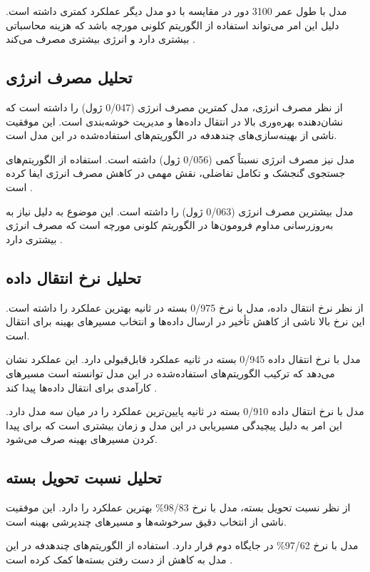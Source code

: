 \documentclass[12pt, onecolumn, a4paper]{article}
\begin{document}
مدل  با طول عمر 3100 دور در مقایسه با دو مدل دیگر عملکرد کمتری داشته است. دلیل این امر می‌تواند استفاده از الگوریتم کلونی مورچه باشد که هزینه محاسباتی بیشتری دارد و انرژی بیشتری مصرف می‌کند \cite{ref7}.

\subsection*{تحلیل مصرف انرژی}
از نظر مصرف انرژی، مدل  کمترین مصرف انرژی (0/047 ژول) را داشته است که نشان‌دهنده بهره‌وری بالا در انتقال داده‌ها و مدیریت خوشه‌بندی است. این موفقیت ناشی از بهینه‌سازی‌های چندهدفه در الگوریتم‌های استفاده‌شده در این مدل است.

مدل  نیز مصرف انرژی نسبتاً کمی (0/056 ژول) داشته است. استفاده از الگوریتم‌های جستجوی گنجشک و تکامل تفاضلی، نقش مهمی در کاهش مصرف انرژی ایفا کرده است \cite{ref5}.

مدل  بیشترین مصرف انرژی (0/063 ژول) را داشته است. این موضوع به دلیل نیاز به به‌روزرسانی مداوم فرومون‌ها در الگوریتم کلونی مورچه است که مصرف انرژی بیشتری دارد \cite{ref6}.

\subsection*{تحلیل نرخ انتقال داده}
از نظر نرخ انتقال داده، مدل  با نرخ 0/975 بسته در ثانیه بهترین عملکرد را داشته است. این نرخ بالا ناشی از کاهش تأخیر در ارسال داده‌ها و انتخاب مسیرهای بهینه برای انتقال است.

مدل  با نرخ انتقال داده 0/945 بسته در ثانیه عملکرد قابل‌قبولی دارد. این عملکرد نشان می‌دهد که ترکیب الگوریتم‌های استفاده‌شده در این مدل توانسته است مسیرهای کارآمدی برای انتقال داده‌ها پیدا کند \cite{ref5}.

مدل  با نرخ انتقال داده 0/910 بسته در ثانیه پایین‌ترین عملکرد را در میان سه مدل دارد. این امر به دلیل پیچیدگی مسیریابی در این مدل و زمان بیشتری است که برای پیدا کردن مسیرهای بهینه صرف می‌شود.

\subsection*{تحلیل نسبت تحویل بسته}
از نظر نسبت تحویل بسته، مدل  با نرخ 98/83\% بهترین عملکرد را دارد. این موفقیت ناشی از انتخاب دقیق سرخوشه‌ها و مسیرهای چندپرشی بهینه است.

مدل  با نرخ 97/62\% در جایگاه دوم قرار دارد. استفاده از الگوریتم‌های چندهدفه در این مدل به کاهش از دست رفتن بسته‌ها کمک کرده است \cite{ref6}.
\end{document}
